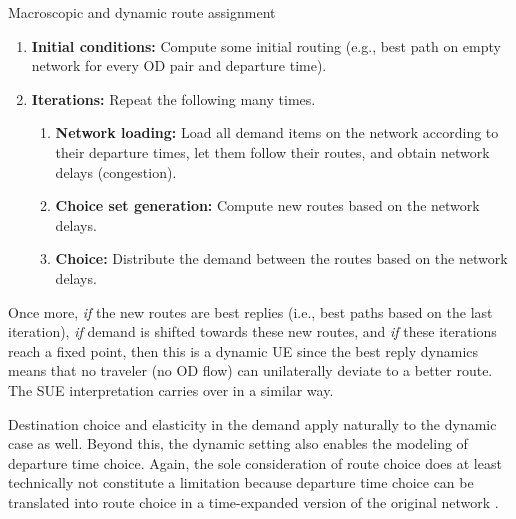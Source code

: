 \begin{algorithm}[H]
\label{dynamic-macro-routes}

\caption{Macroscopic and dynamic route assignment}

\begin{enumerate}

\item \textbf{Initial conditions:} Compute some initial routing (e.g., best path on empty network
  for every OD pair and departure time).

\item \textbf{Iterations:} Repeat the following many times.

\begin{enumerate}

\item \textbf{Network loading:} Load all demand items on the network
  according to their departure times, let them follow their
  routes, and obtain network delays (congestion).

\item \textbf{Choice set generation:} Compute new routes based on the
  network delays.

\item \textbf{Choice:} Distribute the demand between the routes based
  on the network delays.

\end{enumerate} %

\end{enumerate}

\end{algorithm}

Once more, \emph{if} the new routes are best replies (i.e., best paths
based on the last iteration), \emph{if} demand is shifted towards
these new routes, and \emph{if} these iterations reach a fixed point,
then this is a dynamic UE since the best reply dynamics means that no
traveler (no OD flow) can unilaterally deviate to a better route.  The
SUE interpretation carries over in a similar way.

Destination choice and elasticity in the demand apply naturally to the dynamic case as well. Beyond this, the dynamic setting also enables the modeling of departure time choice. Again, the sole consideration of route choice does at least technically not constitute a limitation because departure time choice can be translated into route choice in a time-expanded version of the original network \citep{vanderzijpp-2001}.

